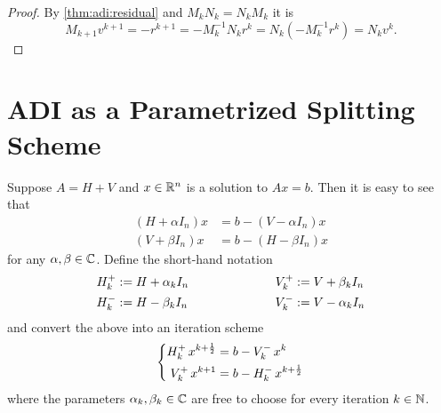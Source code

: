 \begin{proof}
  By \autoref{thm:adi:residual} and $M_k N_k = N_k M_k$ it is
  \begin{equation*}
    M_{k+1} v^{k+1}
    = - r^{k+1}
    = - M_k^{-1} N_k r^k
    = N_k (- M_k^{-1} r^k)
    = N_k v^k
    .
  \end{equation*}
\end{proof}


\section{ADI as a Parametrized Splitting Scheme}
\label{sec:adi:1step}

Suppose $A=H+V$ and $x\in\mathbb{R}^n$ is a solution to $Ax=b$.
Then it is easy to see that
\begin{equation}
\begin{aligned}
  (H + \alpha I_n)x &= b - (V - \alpha I_n) x \\
  (V + \beta I_n)x &= b - (H - \beta I_n) x
\end{aligned}
\end{equation}
for any $\alpha, \beta \in\mathbb{C}$.
Define the short-hand notation
\begin{equation}
\label{eq:adi:shorthand}
\begin{aligned}
  \Aip  &:= H + \alpha_k I_n &
  \qquad\qquad\qquad %
  \Aiip &:= V + \beta_k  I_n \\
  \Aim  &:= H - \beta_k  I_n &
  \Aiim &:= V - \alpha_k I_n
\end{aligned}
\end{equation}
and convert the above into an iteration scheme
\begin{equation}
  \label{eq:adi:general2step}
  \left\{
  \begin{aligned}
    \mathop{H_k^+}  x^{k+\frac{1}{2}} &= b - \mathop{V_k^-} x^k \\
    \mathop{V_k^+} x^{k+1}           &= b - \mathop{H_k^-} x^{k+\frac{1}{2}}
  \end{aligned}
  \right.
\end{equation}
where the parameters $\alpha_k, \beta_k \in\mathbb{C}$ are free to choose for every iteration $k\in\mathbb{N}$.

